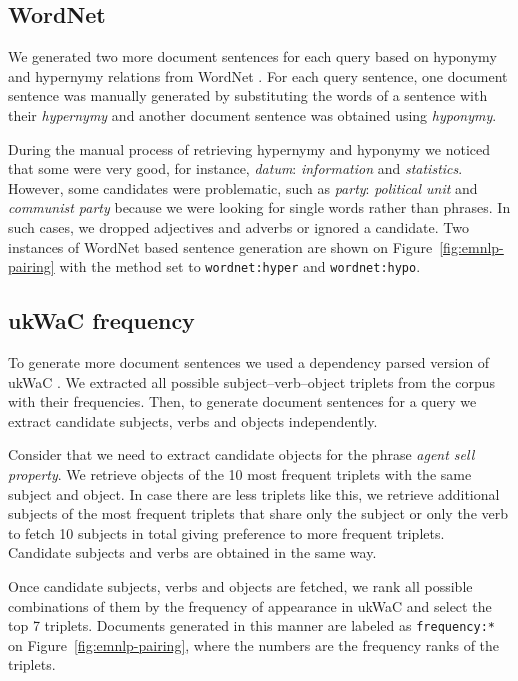 \subsection{WordNet}
We generated two more document sentences for each query based on hyponymy and hypernymy relations from WordNet \cite{Miller:1995:WLD:219717.219748}. For each query sentence, one document sentence was manually generated by substituting the words of a sentence with their \emph{hypernymy} and another document sentence was obtained using \emph{hyponymy}.

During the manual process of retrieving hypernymy and hyponymy we noticed that some were very good, for instance, \textit{datum}: \textit{information} and \textit{statistics}. However, some candidates were problematic, such as \textit{party}: \textit{political unit} and \textit{communist party} because we were looking for single words rather than phrases. In such cases, we dropped adjectives and adverbs or ignored a candidate. Two instances of WordNet based sentence generation are shown on Figure~\ref{fig:emnlp-pairing} with the method set to \texttt{wordnet:hyper} and \texttt{wordnet:hypo}.

\subsection{ukWaC frequency}

To generate more document sentences we used a dependency parsed version of ukWaC \cite{ukwac}.\footnotemark{} We extracted all possible subject--verb--object triplets from the corpus with their frequencies. Then, to generate document sentences for a query we extract candidate subjects, verbs and objects independently.


Consider that we need to extract candidate objects for the phrase \textit{agent sell property}. We retrieve objects of the 10 most frequent triplets with the same subject and object. In case there are less triplets like this, we retrieve additional subjects of the most frequent triplets that share only the subject or only the verb to fetch 10 subjects in total giving preference to more frequent triplets. Candidate subjects and verbs are obtained in the same way.

Once candidate subjects, verbs and objects are fetched, we rank all possible combinations of them by the frequency of appearance in ukWaC and select the top 7 triplets. Documents generated in this manner are labeled as \texttt{frequency:*} on Figure~\ref{fig:emnlp-pairing}, where the numbers are the frequency ranks of the triplets.

